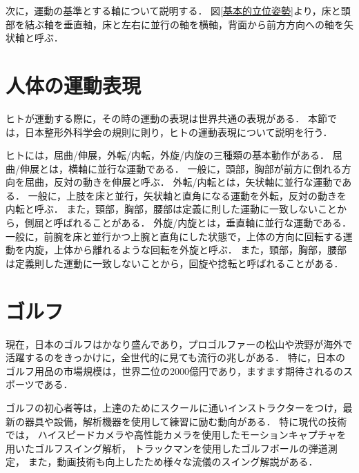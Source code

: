 次に，運動の基準とする軸について説明する．
図\ref{基本的立位姿勢}より，床と頭部を結ぶ軸を垂直軸，床と左右に並行の軸を横軸，背面から前方方向への軸を矢状軸と呼ぶ．



\section{人体の運動表現}
ヒトが運動する際に，その時の運動の表現は世界共通の表現がある．
本節では，日本整形外科学会の規則に則り，ヒトの運動表現について説明を行う．

ヒトには，屈曲/伸展，外転/内転，外旋/内旋の三種類の基本動作がある．
屈曲/伸展とは，横軸に並行な運動である．
一般に，頭部，胸部が前方に倒れる方向を屈曲，反対の動きを伸展と呼ぶ．
外転/内転とは，矢状軸に並行な運動である．
一般に，上肢を床と並行，矢状軸と直角になる運動を外転，反対の動きを内転と呼ぶ．
また，頸部，胸部，腰部は定義に則した運動に一致しないことから，側屈と呼ばれることがある．
外旋/内旋とは，垂直軸に並行な運動である．
一般に，前腕を床と並行かつ上腕と直角にした状態で，上体の方向に回転する運動を内旋，上体から離れるような回転を外旋と呼ぶ．
また，頸部，胸部，腰部は定義則した運動に一致しないことから，回旋や捻転と呼ばれることがある．

\section{ゴルフ}
%
現在，日本のゴルフはかなり盛んであり，プロゴルファーの松山や渋野が海外で活躍するのをきっかけに，全世代的に見ても流行の兆しがある．
特に，日本のゴルフ用品の市場規模は，世界二位の2000億円であり，ますます期待されるのスポーツである．

ゴルフの初心者等は，上達のためにスクールに通いインストラクターをつけ，最新の器具や設備，解析機器を使用して練習に励む動向がある．
特に現代の技術では，
ハイスピードカメラや高性能カメラを使用したモーションキャプチャを用いたゴルフスイング解析，
トラックマンを使用したゴルフボールの弾道測定，
また，動画技術も向上したため様々な流儀のスイング解説がある．

